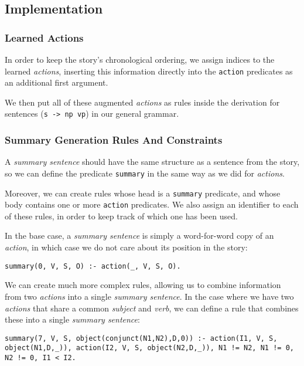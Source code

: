\subsection{Implementation}

\subsubsection{Learned Actions}

In order to keep the story's chronological ordering, we assign indices to the learned \textit{actions}, inserting this information directly into the \texttt{action} predicates as an additional first argument.

We then put all of these augmented \textit{actions} as rules inside the derivation for sentences (\texttt{s -> np vp}) in our general grammar. 

\subsubsection{Summary Generation Rules And Constraints}

A \textit{summary sentence} should have the same structure as a sentence from the story, so we can define the predicate \texttt{summary} in the same way as we did for \textit{actions}.

Moreover, we can create rules whose head is a \texttt{summary} predicate, and whose body contains one or more \texttt{action} predicates. We also assign an identifier to each of these rules, in order to keep track of which one has been used.

In the base case, a \textit{summary sentence} is simply a word-for-word copy of an \textit{action}, in which case we do not care about its position in the story:

\begin{displayquote}
\begin{lstlisting}[numbers=none]
summary(0, V, S, O) :- action(_, V, S, O).
\end{lstlisting}
\end{displayquote}

We can create much more complex rules, allowing us to combine information from two \textit{actions} into a single \textit{summary sentence}. In the case where we have two \textit{actions} that share a common \textit{subject} and \textit{verb}, we can define a rule that combines these into a single \textit{summary sentence}:

\begin{displayquote}
\begin{lstlisting}[numbers=none]
summary(7, V, S, object(conjunct(N1,N2),D,0)) :- action(I1, V, S, object(N1,D,_)), action(I2, V, S, object(N2,D,_)), N1 != N2, N1 != 0, N2 != 0, I1 < I2.
\end{lstlisting}
\end{displayquote}

